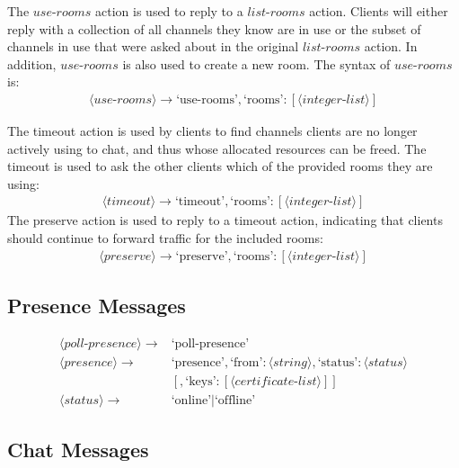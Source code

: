 \documentclass{article}
\begin{document}
The $use\text{-}rooms$ action is used to reply to a $list\text{-}rooms$ action. Clients will
either reply with a collection of all channels they know are in use or the
subset of channels in use that were asked about in the original
$list\text{-}rooms$
action. In addition, $use\text{-}rooms$ is also used to create a new room. The
syntax of $use\text{-}rooms$ is:
\begin{align*}
\langle use\text{-}rooms\rangle \rightarrow \text{`use-rooms'}, \text{`rooms'} :
[\langle integer\text{-}list\rangle ]
\end{align*}

The timeout action is used by clients to find channels clients are no longer
actively using to chat, and thus whose allocated resources can be freed. The
timeout is used to ask the other clients which of the provided rooms they are
using: 
\begin{align*}
\langle timeout\rangle  \rightarrow \text{`timeout'}, \text{`rooms'} : [\langle
integer\text{-}list\rangle ]
\end{align*}
The preserve action is used to reply to a timeout action, indicating that
clients should continue to forward traffic for the included rooms:
\begin{align*}
\langle preserve\rangle  \rightarrow \text{`preserve'}, \text{`rooms'} :
[\langle integer\text{-}list\rangle ]
\end{align*}
\subsection{Presence Messages}

\begin{align*}
\langle poll\text{-}presence\rangle  \rightarrow& \text{`poll-presence'} \\
\langle presence\rangle  \rightarrow& \text{`presence'} , \text{`from'} :
\langle string\rangle, \text{`status'} : \langle status\rangle \\
& [ , \text{`keys'} : [\langle certificate\text{-}list\rangle ] ] \\
\langle status\rangle  \rightarrow& \text{`online'} | \text{`offline'}
\end{align*}
\subsection{Chat Messages}
\end{document}
